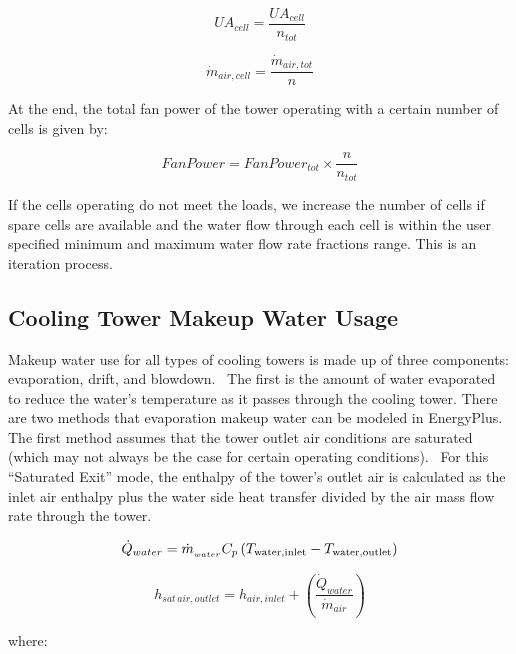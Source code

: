 \begin{equation}
U{A_{cell}} = \frac{{U{A_{cell}}}}{{{n_{tot}}}}
\end{equation}

\begin{equation}
{\dot m_{air,cell}} = \frac{{{{\dot m}_{air,tot}}}}{n}
\end{equation}

At the end, the total fan power of the tower operating with a certain number of cells is given by:

\begin{equation}
FanPower = FanPowe{r_{tot}} \times \frac{n}{{{n_{tot}}}}
\end{equation}

If the cells operating do not meet the loads, we increase the number of cells if spare cells are available and the water flow through each cell is within the user specified minimum and maximum water flow rate fractions range. This is an iteration process.

\subsection{Cooling Tower Makeup Water Usage}\label{cooling-tower-makeup-water-usage-1}

Makeup water use for all types of cooling towers is made up of three components: evaporation, drift, and blowdown. ~The first is the amount of water evaporated to reduce the water's temperature as it passes through the cooling tower. There are two methods that evaporation makeup water can be modeled in EnergyPlus.~ The first method assumes that the tower outlet air conditions are saturated (which may not always be the case for certain operating conditions). ~For this ``Saturated Exit'' mode, the enthalpy of the tower's outlet air is calculated as the inlet air enthalpy plus the water side heat transfer divided by the air mass flow rate through the tower.

\begin{equation}
{\dot Q_{water}} = {\dot m_{_{water}}}{C_p}\left( {{T_{{\rm{water,inlet}}}} - {T_{{\rm{water,outlet}}}}} \right)
\end{equation}

\begin{equation}
{h_{sat\,air,outlet}} = {h_{air,inlet}} + \left( {\frac{{{{\dot Q}_{water}}}}{{{{\dot m}_{air}}}}} \right)
\end{equation}

where:

